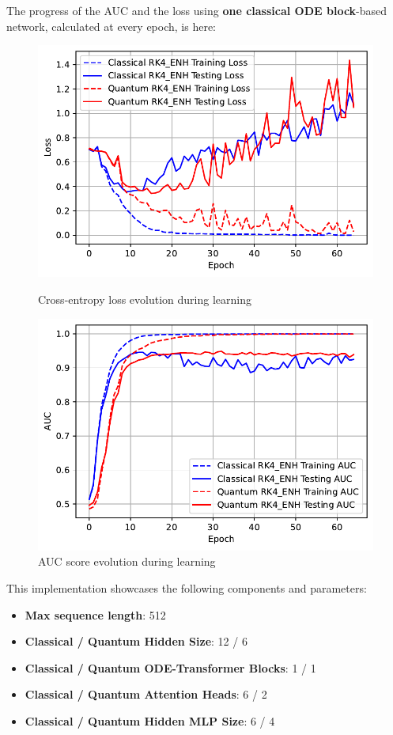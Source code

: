 \documentclass[12pt,a4paper]{report}
\begin{document}
\clearpage

The progress of the AUC and the loss using \textbf{one classical ODE block}-based network, calculated at every epoch, is here:

\begin{figure}[th]
  \centering
  \includegraphics[scale=0.88]{./pics/new_pdf_graphs/hybrid/hybrid_transfomer_loss_imdb_rk4_enh.pdf}
  \caption[Cross-entropy loss evolution during learning]{Cross-entropy loss evolution during learning}
  \label{fig:p37}
  \vspace*{\floatsep}
  \centering
  \includegraphics[scale=0.88]{./pics/new_pdf_graphs/hybrid/hybrid_auc_imdb_.pdf}
  \caption[AUC score evolution during learning]{AUC score evolution during learning}
  \label{fig:p38}
\end{figure}

This implementation showcases the following components and parameters:
\begin{itemize}
  \item \textbf{Max sequence length}: 512
  \item \textbf{Classical / Quantum Hidden Size}: 12 / 6
  \item \textbf{Classical / Quantum ODE-Transformer Blocks}: 1 / 1
  \item \textbf{Classical / Quantum Attention Heads}: 6 / 2
  \item \textbf{Classical / Quantum Hidden MLP Size}: 6 / 4
\end{itemize}
\end{document}
